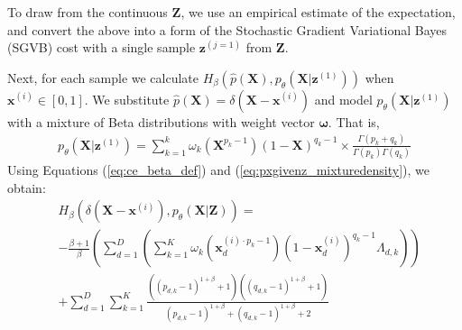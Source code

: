 \iffalse
\begin{align}
    &H_{\beta}\left(\hat{p}(\mathbf{X}), p_{\theta}(\mathbf{X} | \mathbf{z})\right) = \nonumber \\
    &-\frac{\beta+1}{\beta}\!\int\!\hat{p}(\mathbf{X})\left(p_{\theta}(\mathbf{X} | \mathbf{z})^{\beta}-1\right) d \mathbf{X}+\int\!p_{\theta}(\mathbf{X} | \mathbf{z})^{\beta+1} d \mathbf{X}
\end{align}
\fi

To draw from the continuous $\mathbf{Z}$, we use an empirical estimate of the expectation, and convert the above into a form of the Stochastic Gradient Variational Bayes (SGVB) cost \citep{sgvb} with a single sample $\mathbf{z}^{(j=1)}$ from $\mathbf{Z}$.
\iffalse
:
\begin{align}
L_{\beta}\left(\theta, \phi ; \mathbf{x}^{(i)}\right) = &H_{\beta} \left(\hat{p}(\mathbf{X}),p_{\theta}(\mathbf{X} | \mathbf{z}^{(j)})\right) \nonumber \\
&+ D_{K L}\left(q_{\phi}\left(\mathbf{z}^{(j)} | \mathbf{x}^{(i)}\right) \| p_{\theta}(\mathbf{z}^{(j)})\right) \label{eq:loss_beta_sgvb}
\end{align}
\fi
Next, for each sample we calculate $H_{\beta}(\hat{p}(\mathbf{X}),p_{\theta}(\mathbf{X} | \mathbf{z}^{(1)}))$ when $\mathbf{x}^{(i)} \in [0,1]$. We substitute $\hat{p}(\mathbf{X})=\delta\left(\mathbf{X}-\mathbf{x}^{(i)}\right)$ and model $p_{\theta}(\mathbf{X} | \mathbf{z}^{(1)})$ with a mixture of Beta distributions with weight vector $\mathbf{\omega}$. That is,
\begin{align}
    p_{\theta}(\mathbf{X} | \mathbf{z}^{(1)}) = \sum_{k=1}^{k} \omega_k (\mathbf{X}^{p_k-1})(1-\mathbf{X})^{q_k-1} \times \frac{\Gamma(p_k+q_k)}{\Gamma(p_k)\Gamma(q_k)} \label{eq:pxgivenz_mixturedensity}
\end{align}
Using Equations (\ref{eq:ce_beta_def}) and (\ref{eq:pxgivenz_mixturedensity}), we obtain:
\begin{align}
    &H_{\beta}(\delta(\mathbf{X}-\mathbf{x}^{(i)}),p_{\theta}(\mathbf{X} | \mathbf{Z})) = \nonumber \\
    &-\frac{\beta+1}{\beta} \left(\sum_{d=1}^{D}\left(\sum_{k=1}^{K} \omega_k (\mathbf{x}_{d}^{(i) \cdot p_k-1})(1-\mathbf{x}_{d}^{(i)})^{q_k-1} \Lambda_{d,k}\right)\right) \nonumber \\
    &+\sum_{d=1}^{D} \sum_{k=1}^{K}\frac{\left((p_{d,k}-1)^{1+\beta}+1\right) \left((q_{d,k}-1)^{1+\beta}+1\right)}{(p_{d,k}-1)^{1+\beta}+(q_{d,k}-1)^{1+\beta}+2} \label{eq:ce_final}
\end{align}
